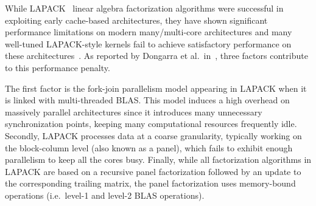While LAPACK~\cite{lug99} linear algebra factorization
algorithms were successful in exploiting early cache-based
architectures, they have shown significant performance
limitations on modern many/multi-core architectures and many
well-tuned LAPACK-style kernels
fail to achieve satisfactory performance on these
architectures~\cite{agullo2009comparative}.
As reported by Dongarra et al\@.~in~\cite{dongarra2011achieving},
three factors contribute to this
performance penalty.

The first factor is the fork-join parallelism
model appearing in LAPACK when it is linked with multi-threaded BLAS.
This model induces a high overhead on
massively parallel architectures since it introduces many unnecessary
synchronization points, keeping many computational resources frequently
idle.
Secondly, LAPACK processes data at a coarse granularity,
typically working on the block-column level (also known as a panel),
which fails to exhibit enough parallelism to
keep all the cores busy.
Finally, while all factorization algorithms in LAPACK are based on
a recursive panel factorization followed by an update to the
corresponding trailing matrix,
the panel factorization uses memory-bound operations
(i.e.\ level-1 and level-2 BLAS operations).

